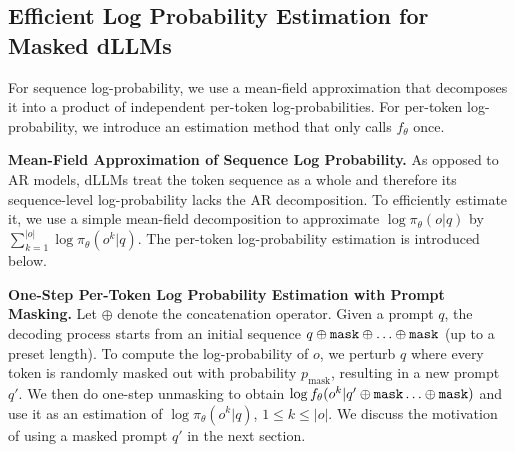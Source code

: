 \vspace{-2mm}
\subsection{Efficient Log Probability Estimation for Masked dLLMs}
\label{sec:method_logprob}
\vspace{-1.6mm}

For sequence log-probability, we use a mean-field approximation that decomposes it into a product of independent per-token log-probabilities.
For per-token log-probability, we introduce an estimation method that only calls $f_\theta$ once.

\textbf{Mean-Field Approximation of Sequence Log Probability.} 
As opposed to AR models, dLLMs treat the token sequence as a whole and therefore its sequence-level log-probability lacks the AR decomposition. 
To efficiently estimate it, we use a simple mean-field decomposition to approximate $\log \pi_\theta(o| q)$ by $\sum_{k=1}^{|o|} \log \pi_\theta(o^k | q)$. The per-token log-probability estimation is introduced below.

\textbf{One-Step Per-Token Log Probability Estimation with Prompt Masking.} 
Let $\oplus$ denote the concatenation operator. Given a prompt $q$, the decoding process starts from an initial sequence $q \oplus {\texttt{mask}} \oplus \ldots \oplus {\texttt{mask}}$ (up to a preset length). To compute the log-probability of $o$, we perturb $q$ where every token is randomly masked out with probability $p_{\text{mask}}$, resulting in a new prompt $q'$. We then do one-step unmasking to obtain $\log f_\theta( o^k | q' \oplus {\texttt{mask}}  \ldots \oplus {\texttt{mask}} )$ and use it as an estimation of $\log \pi_\theta(o^k | q)$, $1\leq k \leq |o|$.  We discuss the motivation of using a masked prompt $q'$ in the next section. 

